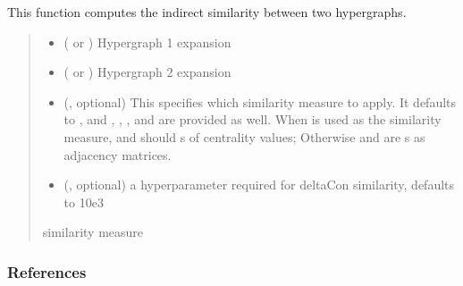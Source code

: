 \documentclass[letterpaper,10pt,english]{sphinxmanual}
\begin{document}
\begin{fulllineitems}
\label{\detokenize{HAT:HAT.HAT.indirectSimilarity}}
\pysigstartsignatures
{}
\pysigstopsignatures
\sphinxAtStartPar
This function computes the indirect similarity between two hypergraphs.
\begin{quote}\begin{description}
\begin{itemize}
\item {} 
\sphinxAtStartPar
{} ( or ) \textendash{} Hypergraph 1 expansion

\item {} 
\sphinxAtStartPar
{} ( or ) \textendash{} Hypergraph 2 expansion

\item {} 
\sphinxAtStartPar
{} (, optional) \textendash{} This specifies which similarity measure to apply. It defaults to  , and
 ,  ,  , and  are provided as well. When 
is used as the similarity measure,  and  should  s of centrality values; Otherwise
 and  are  s as adjacency matrices.

\item {} 
\sphinxAtStartPar
{} (, optional) \textendash{} a hyperparameter required for deltaCon similarity, defaults to 10e\sphinxhyphen{}3

\end{itemize}

\sphinxAtStartPar
similarity measure

\sphinxAtStartPar
{}

\end{description}\end{quote}
\subsubsection*{References}

\end{fulllineitems}
\end{document}
